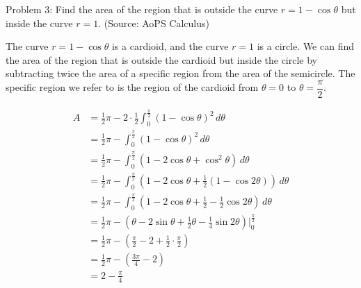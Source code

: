 Problem 3: Find the area of the region that is outside the curve $r = 1 - \cos \theta$ but inside the curve $r = 1$. (Source: AoPS Calculus)

The curve $r = 1 - \cos \theta$ is a cardioid, and the curve $r = 1$ is a circle. We can find the area of the region that is outside the cardioid but inside the circle by subtracting twice the area of a specific region from the area of the semicircle. The specific region we refer to is the region of the cardioid from $\theta = 0$ to $\theta = \dfrac{\pi}{2}$.

\begin{align*}
A &= \frac{1}{2} \pi - 2 \cdot \frac{1}{2} \int_0^{\frac{\pi}{2}} (1 - \cos \theta)^2 \, d\theta \\
&= \frac{1}{2} \pi - \int_0^{\frac{\pi}{2}} (1 - \cos \theta)^2 \, d\theta \\
&= \frac{1}{2} \pi - \int_0^{\frac{\pi}{2}} (1 - 2 \cos \theta + \cos^2 \theta) \, d\theta \\
&= \frac{1}{2} \pi - \int_0^{\frac{\pi}{2}} (1 - 2 \cos \theta + \frac{1}{2}(1 - \cos 2\theta)) \, d\theta \\
&= \frac{1}{2} \pi - \int_0^{\frac{\pi}{2}} (1 - 2 \cos \theta + \frac{1}{2} - \frac{1}{2} \cos 2\theta) \, d\theta \\
&= \frac{1}{2} \pi - (\theta - 2 \sin \theta + \frac{1}{2} \theta - \frac{1}{4} \sin 2\theta) \Bigg|_0^{\frac{\pi}{2}} \\
&= \frac{1}{2} \pi - \left(\frac{\pi}{2} - 2 + \frac{1}{2} \cdot \frac{\pi}{2} \right) \\
&= \frac{1}{2} \pi - \left(\frac{3\pi}{4} - 2 \right) \\
&= \boxed{2 - \frac{\pi}{4}}
\end{align*}
